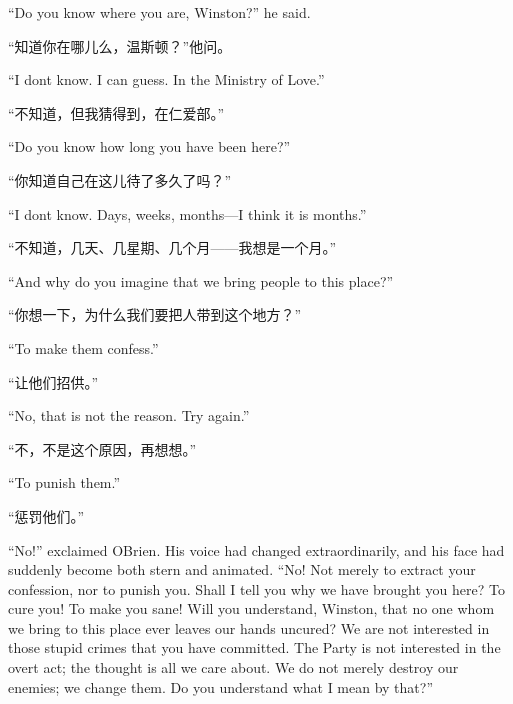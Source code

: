\begin{paracol}{2}
\switchcolumn*

``Do you know where you are, Winston?'' he said.

\switchcolumn

``知道你在哪儿么，温斯顿？''他问。

\switchcolumn*

``I don\textquotesingle t know. I can guess. In the Ministry of Love.''

\switchcolumn

``不知道，但我猜得到，在仁爱部。''

\switchcolumn*

``Do you know how long you have been here?''

\switchcolumn

``你知道自己在这儿待了多久了吗？''

\switchcolumn*

``I don\textquotesingle t know. Days, weeks, months---I think it is
months.''

\switchcolumn

``不知道，几天、几星期、几个月——我想是一个月。''

\switchcolumn*

``And why do you imagine that we bring people to this place?''

\switchcolumn

``你想一下，为什么我们要把人带到这个地方？''

\switchcolumn*

``To make them confess.''

\switchcolumn

``让他们招供。''

\switchcolumn*

``No, that is not the reason. Try again.''

\switchcolumn

``不，不是这个原因，再想想。''

\switchcolumn*

``To punish them.''

\switchcolumn

``惩罚他们。''

\switchcolumn*

``No!'' exclaimed O\textquotesingle Brien. His voice had changed
extraordinarily, and his face had suddenly become both stern and
animated. ``No! Not merely to extract your confession, nor to punish you.
Shall I tell you why we have brought you here? To cure you! To make you
sane! Will you understand, Winston, that no one whom we bring to this
place ever leaves our hands uncured? We are not interested in those
stupid crimes that you have committed. The Party is not interested in
the overt act; the thought is all we care about. We do not merely
destroy our enemies; we change them. Do you understand what I mean by
that?''


\end{paracol}
